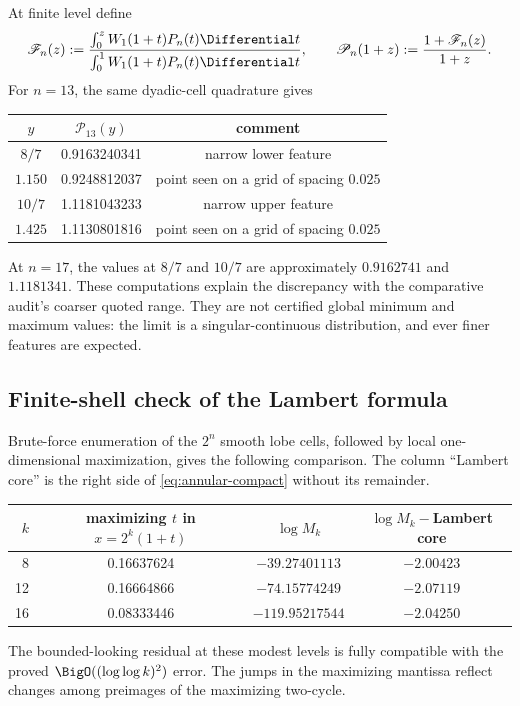 \documentclass[11pt,oneside]{article}
\theoremstyle{definition}
\theoremstyle{remark}
\begin{document}
At finite level define
\begin{equation}
 \mathscr F_n(z):=
 \frac{\int_0^zW_1(1+t)P_n(t)\Differential t}
      {\int_0^1W_1(1+t)P_n(t)\Differential t},
 \qquad
 \mathscr P_n(1+z):=\frac{1+\mathscr F_n(z)}{1+z}.
 \label{eq:finite-profile}
\end{equation}
For $n=13$, the same dyadic-cell quadrature gives
\begin{center}
\begin{tabular}{@{}ccc@{}}
\toprule
$y$ & $\mathscr P_{13}(y)$ & comment\\
\midrule
$8/7$  & 0.9163240341 & narrow lower feature\\
$1.150$ & 0.9248812037 & point seen on a grid of spacing $0.025$\\
$10/7$ & 1.1181043233 & narrow upper feature\\
$1.425$ & 1.1130801816 & point seen on a grid of spacing $0.025$\\
\bottomrule
\end{tabular}
\end{center}
At $n=17$, the values at $8/7$ and $10/7$ are approximately
$0.9162741$ and $1.1181341$.  These computations explain the discrepancy with
the comparative audit's coarser quoted range.  They are not certified global
minimum and maximum values: the limit is a singular-continuous distribution,
and ever finer features are expected.

\subsection{Finite-shell check of the Lambert formula}

Brute-force enumeration of the $2^n$ smooth lobe cells, followed by local
one-dimensional maximization, gives the following comparison.  The column
``Lambert core'' is the right side of \eqref{eq:annular-compact} without its
remainder.

\begin{center}
\begin{tabular}{@{}rccc@{}}
\toprule
$k$ & maximizing $t$ in $x=2^k(1+t)$ & $\log M_k$ &
$\log M_k-$Lambert core\\
\midrule
8  & 0.16637624 & $-39.27401113$  & $-2.00423$\\
12 & 0.16664866 & $-74.15774249$  & $-2.07119$\\
16 & 0.08333446 & $-119.95217544$ & $-2.04250$\\
\bottomrule
\end{tabular}
\end{center}
The bounded-looking residual at these modest levels is fully compatible with
the proved $\BigO((\log\log k)^2)$ error.  The jumps in the maximizing
mantissa reflect changes among preimages of the maximizing two-cycle.
\end{document}
